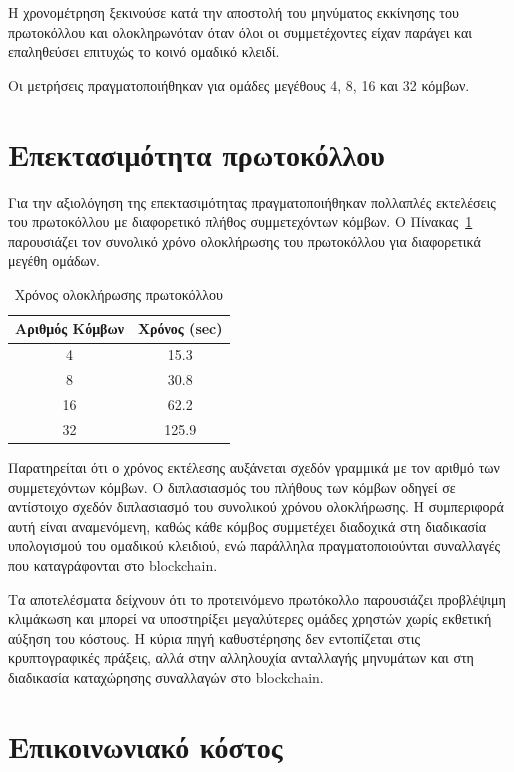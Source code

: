 \documentclass[12pt,a4paper]{report}
\begin{document}
Η χρονομέτρηση ξεκινούσε κατά την αποστολή του μηνύματος
εκκίνησης του πρωτοκόλλου και ολοκληρωνόταν όταν όλοι οι
συμμετέχοντες είχαν παράγει και επαληθεύσει επιτυχώς το
κοινό ομαδικό κλειδί.

Οι μετρήσεις πραγματοποιήθηκαν για ομάδες μεγέθους
4, 8, 16 και 32 κόμβων.

\section{Επεκτασιμότητα πρωτοκόλλου}

Για την αξιολόγηση της επεκτασιμότητας πραγματοποιήθηκαν πολλαπλές εκτελέσεις του πρωτοκόλλου με διαφορετικό πλήθος συμμετεχόντων κόμβων.
Ο Πίνακας~\ref{tab:execution} παρουσιάζει τον συνολικό χρόνο ολοκλήρωσης του πρωτοκόλλου για διαφορετικά μεγέθη ομάδων.

\begin{table}[H]
\centering
\caption{Χρόνος ολοκλήρωσης πρωτοκόλλου}
\label{tab:execution}
\begin{tabular}{|c|c|}
\hline
Αριθμός Κόμβων & Χρόνος (sec)\\
\hline
4  & 15.3 \\
8  & 30.8 \\
16 & 62.2 \\
32 & 125.9 \\
\hline
\end{tabular}
\end{table}

Παρατηρείται ότι ο χρόνος εκτέλεσης αυξάνεται σχεδόν γραμμικά με τον αριθμό των συμμετεχόντων κόμβων.
Ο διπλασιασμός του πλήθους των κόμβων οδηγεί σε αντίστοιχο σχεδόν διπλασιασμό του συνολικού χρόνου ολοκλήρωσης.
Η συμπεριφορά αυτή είναι αναμενόμενη, καθώς κάθε κόμβος συμμετέχει διαδοχικά στη διαδικασία υπολογισμού του ομαδικού κλειδιού, ενώ παράλληλα πραγματοποιούνται συναλλαγές που καταγράφονται στο blockchain.

Τα αποτελέσματα δείχνουν ότι το προτεινόμενο πρωτόκολλο παρουσιάζει προβλέψιμη κλιμάκωση και μπορεί να υποστηρίξει μεγαλύτερες ομάδες χρηστών χωρίς εκθετική αύξηση του κόστους.
Η κύρια πηγή καθυστέρησης δεν εντοπίζεται στις κρυπτογραφικές πράξεις, αλλά στην αλληλουχία ανταλλαγής μηνυμάτων και στη διαδικασία καταχώρησης συναλλαγών στο blockchain.

\section{Επικοινωνιακό κόστος}
\end{document}
